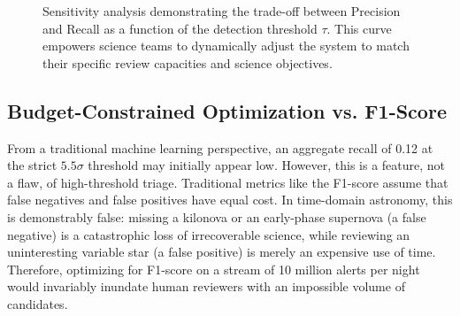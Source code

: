 \documentclass[10pt,journal,compsoc]{IEEEtran}
\begin{document}
\begin{figure}[htbp]
    \centering
    \caption{Sensitivity analysis demonstrating the trade-off between Precision and Recall as a function of the detection threshold $\tau$. This curve empowers science teams to dynamically adjust the system to match their specific review capacities and science objectives.}
    \label{fig:sensitivity}
\end{figure}

\subsection{Budget-Constrained Optimization vs. F1-Score}
From a traditional machine learning perspective, an aggregate recall of 0.12 at the strict $5.5\sigma$ threshold may initially appear low. However, this is a feature, not a flaw, of high-threshold triage. Traditional metrics like the F1-score assume that false negatives and false positives have equal cost. In time-domain astronomy, this is demonstrably false: missing a kilonova or an early-phase supernova (a false negative) is a catastrophic loss of irrecoverable science, while reviewing an uninteresting variable star (a false positive) is merely an expensive use of time. Therefore, optimizing for F1-score on a stream of 10 million alerts per night would invariably inundate human reviewers with an impossible volume of candidates. 
\end{document}

